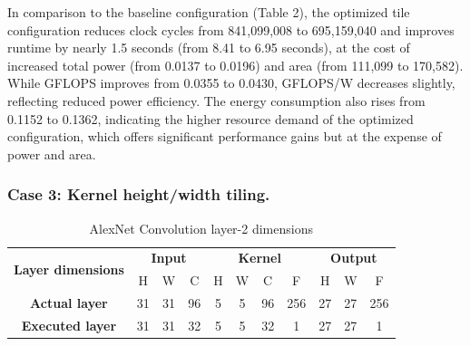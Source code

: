 In comparison to the baseline configuration (Table 2), the optimized tile configuration reduces clock cycles from 841,099,008 to 695,159,040 and improves runtime by nearly 1.5 seconds (from 8.41 to 6.95 seconds), at the cost of increased total power (from 0.0137 to 0.0196) and area (from 111,099 to 170,582). While GFLOPS improves from 0.0355 to 0.0430, GFLOPS/W decreases slightly, reflecting reduced power efficiency. The energy consumption also rises from 0.1152 to 0.1362, indicating the higher resource demand of the optimized configuration, which offers significant performance gains but at the expense of power and area.

\subsubsection{Case 3: Kernel height/width tiling.}

\begin{table}[H]
\centering
\caption{AlexNet Convolution layer-2 dimensions}
\label{tab:tileConvolutionCase3Dim}
 \begin{tabular}{|c|c|c|c|c|c|c|c|c|c|c|} \hline  
 
 \multirow{2}{*}{\textbf{Layer dimensions}} &  
 \multicolumn{3}{|c|}{\textbf{Input}} &  
 \multicolumn{4}{|c|}{\textbf{Kernel}} &  
 \multicolumn{3}{|c|}{\textbf{Output}}\\ \cline{2-11}
 & H &  W &  C&  H &  W &  C &  F &  H &  W & F\\ \hline  
 \textbf{Actual layer} &  31 & 31 & 96 & 5 & 5 & 96 & 256 & 27 & 27 & 256\\ \hline 
 \textbf{Executed layer} & 31 & 31 & \cellcolor{yellow}32 & 5 & 5 & \cellcolor{yellow}32 & \cellcolor{yellow}1 & 27 & 27 & \cellcolor{yellow}1 \\ \hline 
 \end{tabular}
\end{table}


